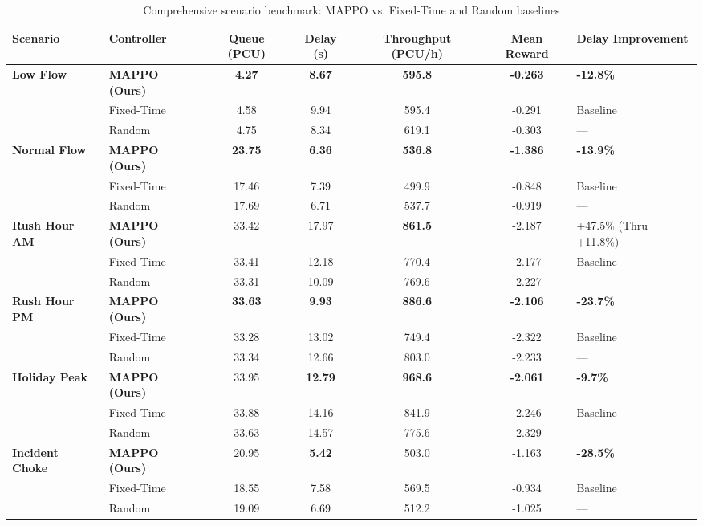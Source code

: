 \documentclass[12pt,a4paper,oneside]{report}
\begin{document}
\begin{table}[htbp]
\centering
\scriptsize
\setlength{\tabcolsep}{3pt}
\caption{Comprehensive scenario benchmark: MAPPO vs. Fixed-Time and Random baselines}
\label{tab:ch5_eval_summary}
\begin{tabularx}{\textwidth}{|p{2.2cm}|p{2.2cm}|c|c|c|c|X|}
\hline
\textbf{Scenario} & \textbf{Controller} & \textbf{Queue (PCU)} & \textbf{Delay (s)} & \textbf{Throughput (PCU/h)} & \textbf{Mean Reward} & \textbf{Delay Improvement} \\ \hline
\multirow{3}{*}{\textbf{Low Flow}} & \textbf{MAPPO (Ours)} & \textbf{4.27} & \textbf{8.67} & \textbf{595.8} & \textbf{-0.263} & \textbf{-12.8\%} \\
& Fixed-Time & 4.58 & 9.94 & 595.4 & -0.291 & Baseline \\
& Random & 4.75 & 8.34 & 619.1 & -0.303 & --- \\ \hline
\multirow{3}{*}{\textbf{Normal Flow}} & \textbf{MAPPO (Ours)} & \textbf{23.75} & \textbf{6.36} & \textbf{536.8} & \textbf{-1.386} & \textbf{-13.9\%} \\
& Fixed-Time & 17.46 & 7.39 & 499.9 & -0.848 & Baseline \\
& Random & 17.69 & 6.71 & 537.7 & -0.919 & --- \\ \hline
\multirow{3}{*}{\textbf{Rush Hour AM}} & \textbf{MAPPO (Ours)} & 33.42 & 17.97 & \textbf{861.5} & -2.187 & +47.5\% (Thru +11.8\%) \\
& Fixed-Time & 33.41 & 12.18 & 770.4 & -2.177 & Baseline \\
& Random & 33.31 & 10.09 & 769.6 & -2.227 & --- \\ \hline
\multirow{3}{*}{\textbf{Rush Hour PM}} & \textbf{MAPPO (Ours)} & \textbf{33.63} & \textbf{9.93} & \textbf{886.6} & \textbf{-2.106} & \textbf{-23.7\%} \\
& Fixed-Time & 33.28 & 13.02 & 749.4 & -2.322 & Baseline \\
& Random & 33.34 & 12.66 & 803.0 & -2.233 & --- \\ \hline
\multirow{3}{*}{\textbf{Holiday Peak}} & \textbf{MAPPO (Ours)} & 33.95 & \textbf{12.79} & \textbf{968.6} & \textbf{-2.061} & \textbf{-9.7\%} \\
& Fixed-Time & 33.88 & 14.16 & 841.9 & -2.246 & Baseline \\
& Random & 33.63 & 14.57 & 775.6 & -2.329 & --- \\ \hline
\multirow{3}{*}{\textbf{Incident Choke}} & \textbf{MAPPO (Ours)} & 20.95 & \textbf{5.42} & 503.0 & -1.163 & \textbf{-28.5\%} \\
& Fixed-Time & 18.55 & 7.58 & 569.5 & -0.934 & Baseline \\
& Random & 19.09 & 6.69 & 512.2 & -1.025 & --- \\ \hline
\end{tabularx}
\end{table}
\end{document}
